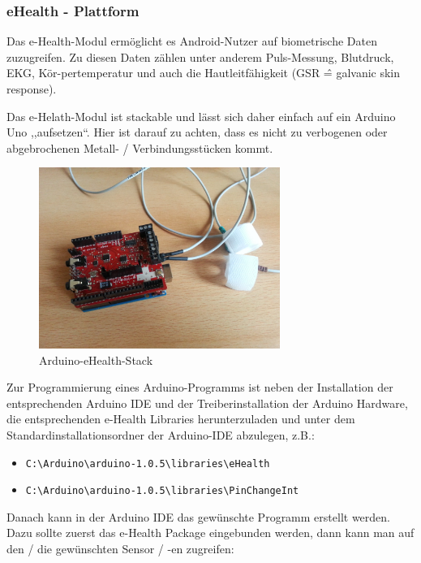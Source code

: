 \documentclass[10pt, a4paper, oneside, titlepage]{scrartcl} %
\begin{document}
	\subsubsection{eHealth - Plattform}
	
	Das e-Health-Modul ermöglicht es Android-Nutzer auf biometrische Daten zuzugreifen. Zu diesen Daten zählen unter anderem Puls-Messung, Blutdruck, EKG, Kör-pertemperatur und auch die Hautleitfähigkeit (GSR \^= galvanic skin response).

	Das e-Helath-Modul ist stackable und lässt sich daher einfach auf ein Arduino Uno ,,aufsetzen``. Hier ist darauf zu achten, dass es nicht zu verbogenen oder abgebrochenen Metall- / Verbindungsstücken kommt.
	
	\begin{figure}[hbtp]
	\centering
	\includegraphics[width=0.7\textwidth]{implementierung_arduino+ehelath-modul.jpg}
	\caption{Arduino-eHealth-Stack}
	\label{fig:Arduino-eHealth-Stack}
	\end{figure}
	
	
	Zur Programmierung eines Arduino-Programms ist neben der Installation der entsprechenden Arduino IDE und der Treiberinstallation der Arduino Hardware, die entsprechenden e-Health Libraries herunterzuladen und unter dem Standardinstallationsordner der Arduino-IDE abzulegen, z.B.:
	\begin{itemize}
	\item \texttt{C:\textbackslash Arduino\textbackslash arduino-1.0.5\textbackslash libraries\textbackslash eHealth}
	\item \texttt{C:\textbackslash Arduino\textbackslash arduino-1.0.5\textbackslash libraries\textbackslash PinChangeInt}
	\end{itemize}
	
	Danach kann in der Arduino IDE das gewünschte Programm erstellt werden. Dazu sollte zuerst das e-Health Package eingebunden werden, dann kann man auf den / die gewünschten Sensor / -en zugreifen:
	
\end{document}
